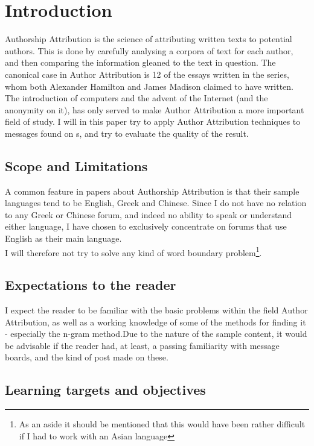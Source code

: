 \section{Introduction}

Authorship Attribution is the science of attributing written texts to potential authors. This is done by carefully analysing a corpora of text for each author, and then comparing the information gleaned to the text in question. The canonical case in Author Attribution is 12 of the essays written in the  series, whom both Alexander Hamilton and James Madison claimed to have written. The introduction of computers and the advent of the Internet (and the anonymity on it), has only served to make Author Attribution a more important field of study. I will in this paper try to apply Author Attribution techniques to messages found on \forum s, and try to evaluate the quality of the result.  

\subsection{Scope and Limitations}
A common feature in papers about Authorship Attribution is that their sample languages tend to be English, Greek and Chinese. Since I do not have no relation to any Greek or Chinese forum, and indeed no ability to speak or understand either language, I have chosen to exclusively concentrate on forums that use English as their main language.\\
I will therefore not try to solve any kind of word boundary problem\footnote{As an aside it should be mentioned that this would have been rather difficult if I had to work with an Asian language}.

\subsection{Expectations to the reader}
I expect the reader to be familiar with the basic problems within the field Author Attribution, as well as a working knowledge of some of the methods for finding it - especially the n-gram method.Due to the nature of the sample content, it would be advisable if the reader had, at least, a passing familiarity with message boards, and the kind of post made on these.

\subsection{Learning targets and objectives}
